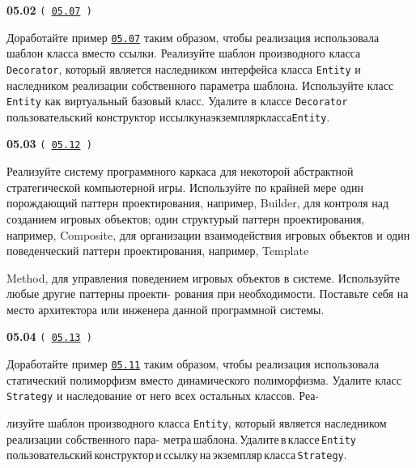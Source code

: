 \documentclass[a4paper,12pt]{article}
\begin{document}
\bigskip

{\large \textbf{05.02} \texttt{(\,\href{https://github.com/i-s-m-mipt/Education/blob/master/projects/examples/source/05.07.cpp}{05.07}\,)}}

\bigskip

Доработайте пример \href{https://github.com/i-s-m-mipt/Education/blob/master/projects/examples/source/05.07.cpp}{\texttt{05.07}} таким образом, чтобы реализация использовала шаблон класса вместо ссылки. Реализуйте шаблон производного класса \lstinline{Decorator}, который является наследником интерфейса класса \lstinline{Entity} и наследником реализации собственного параметра шаблона. Используйте класс \lstinline{Entity} как виртуальный базовый класс. Удалите в классе \lstinline{Decorator} пользовательский конструктор и\:ссылку\:на\:экземпляр\:класса\:\lstinline{Entity}.

\bigskip

{\large \textbf{05.03} \texttt{(\,\href{https://github.com/i-s-m-mipt/Education/blob/master/projects/examples/source/05.12.cpp}{05.12}\,)}}

\bigskip

Реализуйте систему программного каркаса для некоторой абстрактной стратегической компьютерной игры. Используйте по крайней мере один порождающий паттерн проектирования, например, Builder, для контроля над созданием игровых объектов; один структурый паттерн проектирования, например, Composite, для организации взаимодействия игровых объектов и один поведенческий паттерн проектирования, например, Template 

Method, для управления поведением игровых объектов в системе. Используйте любые другие паттерны проекти- рования при необходимости. Поставьте себя на место архитектора или инженера данной программной системы.

\bigskip

{\large \textbf{05.04} \texttt{(\,\href{https://github.com/i-s-m-mipt/Education/blob/master/projects/examples/source/05.13.cpp}{05.13}\,)}}

\bigskip

Доработайте пример \href{https://github.com/i-s-m-mipt/Education/blob/master/projects/examples/source/05.11.cpp}{\texttt{05.11}} таким образом, чтобы реализация использовала статический полиморфизм вместо динамического полиморфизма. Удалите класс \lstinline{Strategy} и наследование от него всех остальных классов. Реа- 

лизуйте шаблон производного класса \lstinline{Entity}, который является наследником реализации собственного пара- метра\,шаблона.\,Удалите\,в\,классе\,\lstinline{Entity}\,пользовательский\,конструктор\,и\,ссылку\,на\,экземпляр\,класса\,\lstinline{Strategy}.
\end{document}
